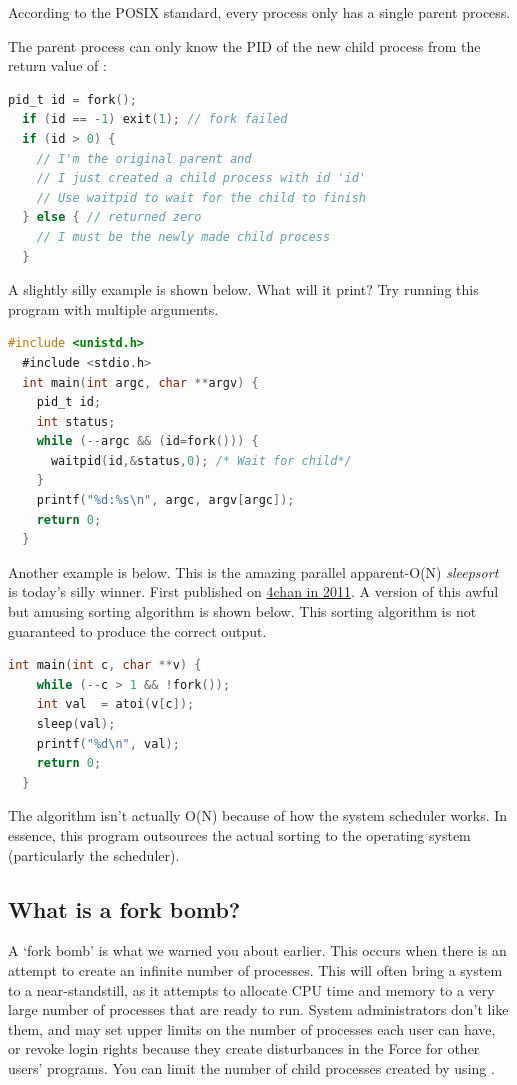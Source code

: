 \begin{itemize}
According to the POSIX standard, every process only has a single parent process.

The parent process can only know the PID of the new child process from the return value of :

\begin{lstlisting}[language=C]
  pid_t id = fork();
  if (id == -1) exit(1); // fork failed
  if (id > 0) {
    // I'm the original parent and
    // I just created a child process with id 'id'
    // Use waitpid to wait for the child to finish
  } else { // returned zero
    // I must be the newly made child process
  }
\end{lstlisting}

A slightly silly example is shown below. What will it print? Try running this program with multiple arguments.

\begin{lstlisting}[language=C]
  #include <unistd.h>
  #include <stdio.h>
  int main(int argc, char **argv) {
    pid_t id;
    int status;
    while (--argc && (id=fork())) {
      waitpid(id,&status,0); /* Wait for child*/
    }
    printf("%d:%s\n", argc, argv[argc]);
    return 0;
  }
\end{lstlisting}

Another example is below.
This is the amazing parallel apparent-O(N) \emph{sleepsort} is today's silly winner. First published on \href{https://dis.4chan.org/read/prog/1295544154}{4chan in 2011}. A version of this awful but amusing sorting algorithm is shown below. This sorting algorithm is not guaranteed to produce the correct output.

\begin{lstlisting}[language=C]
  int main(int c, char **v) {
    while (--c > 1 && !fork());
    int val  = atoi(v[c]);
    sleep(val);
    printf("%d\n", val);
    return 0;
  }
\end{lstlisting}

The algorithm isn't actually O(N) because of how the system scheduler works. In essence, this program outsources the actual sorting to the operating system (particularly the scheduler).

\subsection{What is a fork bomb?}

A `fork bomb' is what we warned you about earlier.
This occurs when there is an attempt to create an infinite number of processes.
This will often bring a system to a near-standstill, as it attempts to allocate CPU time and memory to a very large number of processes that are ready to run.
System administrators don't like them, and may set upper limits on the number of processes each user can have, or revoke login rights because they create disturbances in the Force for other users' programs.
You can limit the number of child processes created by using .


\end{itemize}
